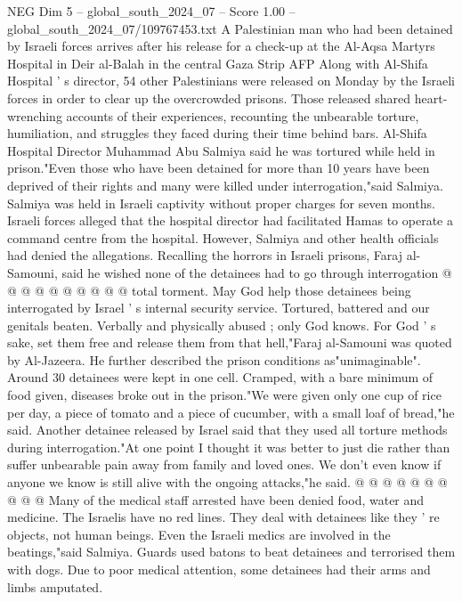 \begin{textsample}{NEG Dim 5 – global\_south\_2024\_07 – Score 1.00 – global\_south\_2024\_07/109767453.txt}  \label{ex:f5_neg_278}
A Palestinian man who had been detained by Israeli forces arrives after his release for a check-up at the Al-Aqsa Martyrs Hospital in Deir al-Balah in the central Gaza Strip AFP Along with Al-Shifa Hospital ' s director, 54 other Palestinians were released on Monday by the Israeli forces in order to clear up the overcrowded prisons.
Those released shared heart-wrenching accounts of their experiences, recounting the unbearable torture, humiliation, and struggles they faced during their time behind bars.
Al-Shifa Hospital Director Muhammad Abu Salmiya said he was tortured while held in prison."Even those who have been detained for more than 10 years have been deprived of their rights and many were killed under interrogation,"said Salmiya.
Salmiya was held in Israeli captivity without proper charges for seven months.
Israeli forces alleged that the hospital director had facilitated Hamas to operate a command centre from the hospital.
However, Salmiya and other health officials had denied the allegations.
Recalling the horrors in Israeli prisons, Faraj al-Samouni, said he wished none of the detainees had to go through interrogation @ @ @ @ @ @ @ @ @ @ total torment.
May God help those detainees being interrogated by Israel ' s internal security service.
Tortured, battered and our genitals beaten.
Verbally and physically abused ; only God knows.
For God ' s sake, set them free and release them from that hell,"Faraj al-Samouni was quoted by Al-Jazeera.
He further described the prison conditions as"unimaginable".
Around 30 detainees were kept in one cell.
Cramped, with a bare minimum of food given, diseases broke out in the prison."We were given only one cup of rice per day, a piece of tomato and a piece of cucumber, with a small loaf of bread,"he said.
Another detainee released by Israel said that they used all torture methods during interrogation."At one point I thought it was better to just die rather than suffer unbearable pain away from family and loved ones.
We don't even know if anyone we know is still alive with the ongoing attacks,"he said. @ @ @ @ @ @ @ @ @ @ Many of the medical staff arrested have been denied food, water and medicine.
The Israelis have no red lines.
They deal with detainees like they ' re objects, not human beings.
Even the Israeli medics are involved in the beatings,"said Salmiya.
Guards used batons to beat detainees and terrorised them with dogs.
Due to poor medical attention, some detainees had their arms and limbs amputated.

\end{textsample}
